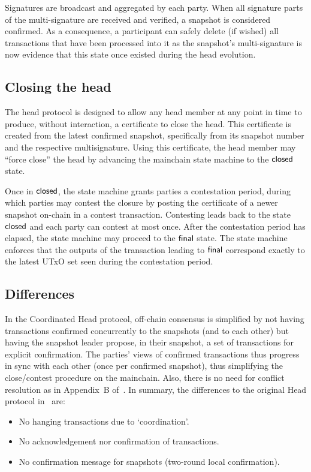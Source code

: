 Signatures are broadcast and aggregated by each party. When all signature parts
of the multi-signature are received and verified, a snapshot is considered
confirmed. As a consequence, a participant can safely delete (if wished) all
transactions that have been processed into it as the snapshot's multi-signature
is now evidence that this state once existed during the head evolution.

\subsection{Closing the head}

The head protocol is designed to allow any head member at any point in time to
produce, without interaction, a certificate to close the head. This certificate
is created from the latest confirmed snapshot, specifically from its snapshot
number and the respective multisignature. Using this certificate, the head
member may ``force close'' the head by advancing the mainchain state machine to
the $\mathsf{closed}$ state.

Once in $\mathsf{closed}$, the state machine grants parties a contestation period,
during which parties may contest the closure by posting the certificate of a
newer snapshot on-chain in a contest transaction. Contesting leads back to the state
$\mathsf{closed}$ and each party can contest at most once. After the contestation period has elapsed, the state machine may
proceed to the $\mathsf{final}$ state. The state machine enforces that the outputs of
the transaction leading to $\mathsf{final}$ correspond exactly to the latest UTxO set
seen during the contestation period.

\subsection{Differences}
In the Coordinated Head protocol, off-chain consensus is simplified by not
having transactions confirmed concurrently to the snapshots (and to each other)
but having the snapshot leader propose, in their snapshot, a set of transactions
for explicit confirmation. The parties' views of confirmed transactions thus
progress in sync with each other (once per confirmed snapshot), thus simplifying
the close/contest procedure on the mainchain. Also, there is no need for
conflict resolution as in Appendix~B of~\cite{hydrahead20}. In summary, the
differences to the original Head protocol in~\cite{hydrahead20} are:

\begin{itemize}
	\item No hanging transactions due to `coordination'.
	\item No acknowledgement nor confirmation of transactions.
	\item No confirmation message for snapshots (two-round local confirmation).
\end{itemize}

